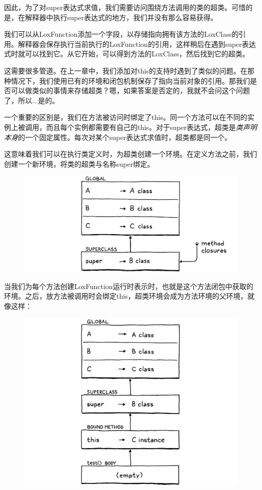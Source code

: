 \documentclass[cn,11pt,chinese]{elegantbook}
\begin{document}
因此，为了对super表达式求值，我们需要访问围绕方法调用的类的超类。可惜的是，在解释器中执行super表达式的地方，我们并没有那么容易获得。

我们可以从LoxFunction添加一个字段，以存储指向拥有该方法的LoxClass的引用。解释器会保存执行当前执行的LoxFunction的引用，这样稍后在遇到super表达式时就可以找到它。从它开始，可以得到方法的LoxClass，然后找到它的超类。

这需要很多管道。在上一章中，我们添加对this的支持时遇到了类似的问题。在那种情况下，我们使用已有的环境和闭包机制保存了指向当前对象的引用。那我们是否可以做类似的事情来存储超类？嗯，如果答案是否定的，我就不会问这个问题了，所以...是的。

一个重要的区别是，我们在方法被访问时绑定了this。同一个方法可以在不同的实例上被调用，而且每个实例都需要有自己的this。对于super表达式，超类是\textit{类声明本身}的一个固定属性。每次对某个super表达式求值时，超类都是同一个。

这意味着我们可以在执行类定义时，为超类创建一个环境。在定义方法之前，我们创建一个新环境，将类的超类与名称super绑定。

\begin{figure}[htbp]
  \centering
  \includegraphics[width=\textwidth]{image/inheritance/superclass.png}
\end{figure}

当我们为每个方法创建LoxFunction运行时表示时，也就是这个方法闭包中获取的环境。之后，放方法被调用时会绑定this，超类环境会成为方法环境的父环境，就像这样：

\begin{figure}[htbp]
  \centering
  \includegraphics[width=\textwidth]{image/inheritance/environments.png}
\end{figure}
\end{document}
